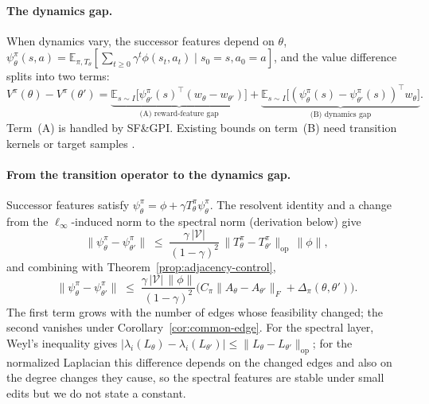 \documentclass[twoside]{article}
\newcommand{\E}{\mathbb{E}}
\newcommand{\Tdist}{T}
\begin{document}
\paragraph{The dynamics gap.} When dynamics vary, the successor features depend on $\theta$, $\psi^\pi_\theta(s,a) = \E_{\pi,\Tdist_\theta}[\sum_{t\ge0}\gamma^t\phi(s_t,a_t) \mid s_0{=}s, a_0{=}a]$, and the value difference splits into two terms:
\begin{equation}
    V^\pi(\theta) - V^\pi(\theta')
    = \underbrace{\E_{s \sim I}\!\big[\psi^\pi_{\theta'}(s)^\top (w_\theta - w_{\theta'})\big]}_{\text{(A) reward-feature gap}}
    + \underbrace{\E_{s \sim I}\!\big[(\psi^\pi_\theta(s) - \psi^\pi_{\theta'}(s))^\top w_\theta\big]}_{\text{(B) dynamics gap}}.
\label{eq:decomposition}
\end{equation}
Term~(A) is handled by SF\&GPI. Existing bounds on term~(B) need transition kernels \citep{kearns2002near, ferns2004metrics, tao2025generalized} or target samples \citep{abdolshah2021new, malekzadeh2023uncertainty}.

\paragraph{From the transition operator to the dynamics gap.} Successor features satisfy $\psi^\pi_\theta = \phi + \gamma T^\pi_\theta \psi^\pi_\theta$. The resolvent identity and a change from the $\ell_\infty$-induced norm to the spectral norm (derivation below) give
\begin{equation}
    \big\| \psi^\pi_\theta - \psi^\pi_{\theta'} \big\|
    \;\leq\;
    \frac{\gamma \, |\mathcal V|}{(1 - \gamma)^2} \, \big\| T^\pi_\theta - T^\pi_{\theta'} \big\|_{\mathrm{op}} \, \|\phi\|,
\label{eq:resolvent-bound}
\end{equation}
and combining with Theorem~\ref{prop:adjacency-control},
\begin{equation}
    \big\| \psi^\pi_\theta - \psi^\pi_{\theta'} \big\|
    \;\leq\;
    \frac{\gamma \, |\mathcal V| \, \|\phi\|}{(1 - \gamma)^2}
    \Big(
        C_\pi \big\| A_\theta - A_{\theta'} \big\|_F
        +
        \Delta_\pi(\theta,\theta')
    \Big).
\label{eq:final-bound}
\end{equation}
The first term grows with the number of edges whose feasibility changed; the second vanishes under Corollary~\ref{cor:common-edge}. For the spectral layer, Weyl's inequality gives $|\lambda_i(L_\theta) - \lambda_i(L_{\theta'})| \le \|L_\theta - L_{\theta'}\|_{\mathrm{op}}$; for the normalized Laplacian this difference depends on the changed edges and also on the degree changes they cause, so the spectral features are stable under small edits but we do not state a constant.
\end{document}
